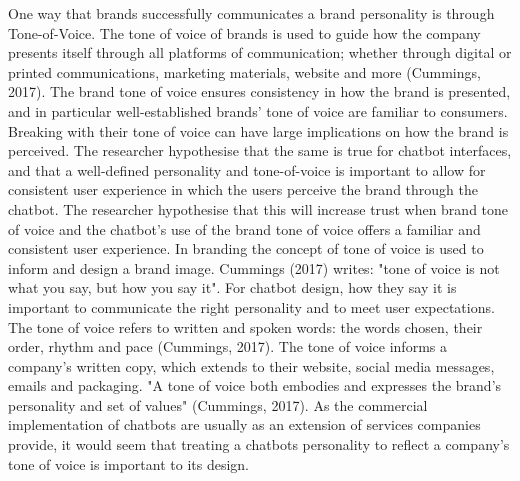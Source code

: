 One way that brands successfully communicates a brand personality is through Tone-of-Voice. The tone of voice of brands is used to guide how the company presents itself through all platforms of communication; whether through digital or printed communications, marketing materials, website and more (Cummings, 2017). The brand tone of voice ensures consistency in how the brand is presented, and in particular well-established brands' tone of voice are familiar to consumers. Breaking with their tone of voice can have large implications on how the brand is perceived. The researcher hypothesise that the same is true for chatbot interfaces, and that a well-defined personality and tone-of-voice is important to allow for consistent user experience in which the users perceive the brand through the chatbot. The researcher hypothesise that this will increase trust when brand tone of voice and the chatbot's use of the brand tone of voice offers a familiar and consistent user experience. In branding the concept of tone of voice is used to inform and design a brand image. Cummings (2017) writes: "tone of voice is not what you say, but how you say it". For chatbot design, how they say it is important to communicate the right personality and to meet user expectations. The tone of voice refers to written and spoken words: the words chosen, their order, rhythm and pace (Cummings, 2017). The tone of voice informs a company's written copy, which extends to their website, social media messages, emails and packaging. "A tone of voice both embodies and expresses the brand's personality and set of values" (Cummings, 2017). As the commercial implementation of chatbots are usually as an extension of services companies provide, it would seem that treating a chatbots personality to reflect a company's tone of voice is important to its design. 

